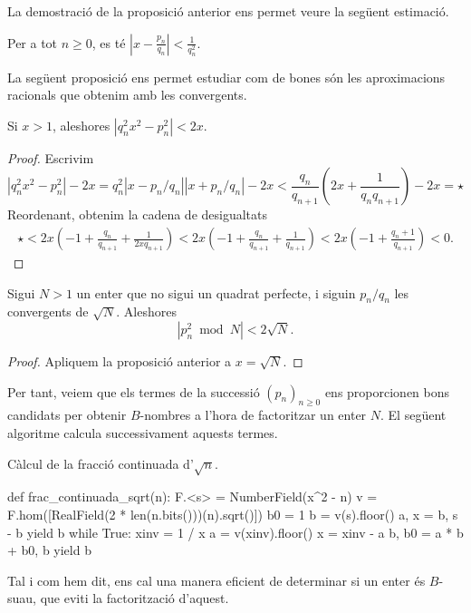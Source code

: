  La demostració de la proposició anterior ens permet veure la següent estimació.
 \begin{corollary}
 Per a tot $n\geq 0$, es té $ \left|x - \frac{p_n}{q_n}\right| < \frac{1}{q_n^2}$.
 \end{corollary}

 La següent proposició ens permet estudiar com de bones són les aproximacions racionals que obtenim amb les convergents.
 \begin{proposition}
  Si $x>1$, aleshores $\left|q_n^2x^2-p_n^2\right| < 2x$.
 \end{proposition}
 \begin{proof}
  Escrivim
  \[
  |q_n^2x^2-p_n^2| - 2x = q_n^2|x-p_n/q_n||x+p_n/q_n| -2x <\frac{q_n}{q_{n+1}}\left(2x+\frac{1}{q_nq_{n+1}}\right) -2x = \star
  \]
  Reordenant, obtenim la cadena de desigualtats
  \begin{align*}
 \star < 2x\left(-1+ \frac{q_n}{q_{n+1}} + \frac{1}{2xq_{n+1}}\right)<2x\left(-1 + \frac{q_n}{q_{n+1}}+\frac{1}{q_{n+1}}\right)
  <2x(-1+\frac{q_{n}+1}{q_{n+1}})<0.
  \end{align*}
 \end{proof}
 
 \begin{corollary}
 Sigui $N>1$ un enter que no sigui un quadrat perfecte, i siguin $p_n/q_n$ les convergents de $\sqrt{N}$.  Aleshores
 \[
 |p_n^2 \bmod N| < 2\sqrt{N}.
 \]
 \end{corollary}
\begin{proof}
Apliquem la proposició anterior a $x=\sqrt{N}$.
\end{proof}
 Per tant, veiem que els termes de la successió $(p_n)_{n\geq 0}$ ens proporcionen bons candidats per obtenir $B$-nombres a l'hora de factoritzar un enter $N$. El següent algoritme calcula successivament aquests termes.
  \begin{algo}
   \caption{Càlcul de la fracció continuada d'$\sqrt{n}$.}
\begin{python}
def frac_continuada_sqrt(n):
    F.<s> = NumberField(x^2 - n)
    v = F.hom([RealField(2 * len(n.bits()))(n).sqrt()])
    b0 = 1
    b = v(s).floor()
    a, x = b, s - b
    yield b
    while True:
        xinv = 1 / x
        a =  v(xinv).floor()
        x = xinv - a
        b, b0 = a * b + b0, b
        yield b
\end{python}
\end{algo}

Tal i com hem dit, ens cal una manera eficient de determinar si un enter és $B$-suau, que eviti la factorització d'aquest.


